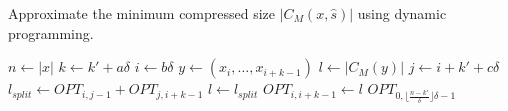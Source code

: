 \begin{algorithm}
	\caption{\label{alg:dyn-approx}Approximate the minimum compressed size $|C_M(x,\hat s)|$ using dynamic programming.}
\begin{algorithmic}
\STATE $n \gets |x|$
	\STATE $k \gets k'+a\delta$
		\STATE $i \gets b\delta$
		\STATE $y \gets (x_i,\dots,x_{i+k-1})$
		\STATE $l \gets |C_M(y)|$
			\STATE $j \gets i + k' + c\delta$
			\STATE $l_{split} \gets OPT_{i,j-1} + OPT_{j,i+k-1}$
				\STATE $l \gets l_{split}$
			\ENDIF
		\ENDFOR
		\STATE $OPT_{i,i+k-1} \gets l$
	\ENDFOR
\ENDFOR
\RETURN $OPT_{0,\lfloor\frac{n-k'}{\delta}\rfloor\delta-1}$
\end{algorithmic}
\end{algorithm}
